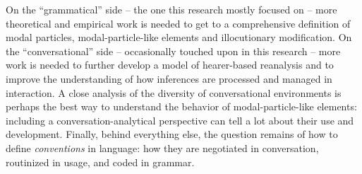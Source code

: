 On the “grammatical” side – the one this research mostly focused on – more theoretical and empirical work is needed to get to a comprehensive definition of modal particles, modal-particle-like elements and illocutionary modification. On the “conversational” side – occasionally touched upon in this research – more work is needed to further develop a model of hearer-based reanalysis and to improve the understanding of how inferences are processed and managed in interaction. A close analysis of the diversity of conversational environments is perhaps the best way to understand the behavior of modal-particle-like elements: including a conversation-analytical perspective can tell a lot about their use and development. Finally, behind everything else, the question remains of how to define \textit{conventions} in language: how they are negotiated in conversation, routinized in usage, and coded in grammar.

